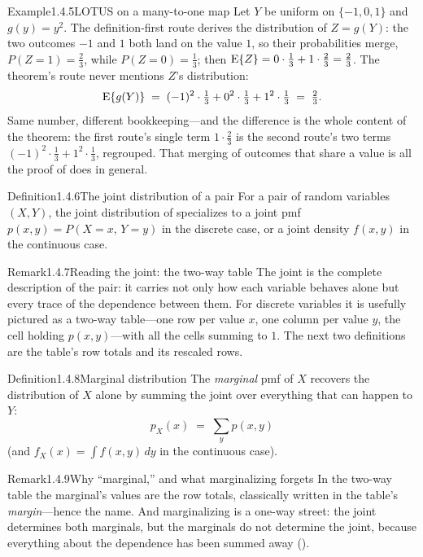 \documentclass[main.tex]{subfiles}
\begin{document}
\begin{ObjL}{Example}{1.4.5}{LOTUS on a many-to-one map}
Let $Y$ be uniform on $\{-1,0,1\}$ and $g(y)=y^2$. The definition-first route derives the
distribution of $Z=g(Y)$: the two outcomes $-1$ and $1$ both land on the value $1$, so their
probabilities merge, $P(Z=1)=\tfrac23$, while $P(Z=0)=\tfrac13$; then
$\mathrm{E}\{Z\}=0\cdot\tfrac13+1\cdot\tfrac23=\tfrac23$. The theorem's route never mentions $Z$'s
distribution:
\[ \mathrm{E}\{g(Y)\} \;=\; (-1)^2\cdot\tfrac13+0^2\cdot\tfrac13+1^2\cdot\tfrac13 \;=\; \tfrac23 . \]
Same number, different bookkeeping---and the difference is the whole content of the theorem:
the first route's single term $1\cdot\tfrac23$ is the second route's two terms
$(-1)^2\cdot\tfrac13+1^2\cdot\tfrac13$, regrouped. That merging of outcomes that share a value
is all the proof of  does in general.
\end{ObjL}

\begin{Obj}{Definition}{1.4.6}{The joint distribution of a pair}
For a pair of random variables $(X,Y)$, the joint distribution of  specializes to
a joint pmf $p(x,y)=P(X=x,\,Y=y)$ in the discrete case, or a joint density $f(x,y)$ in the
continuous case.
\end{Obj}

\begin{ObjL}{Remark}{1.4.7}{Reading the joint: the two-way table}
The joint is the complete description of the pair: it carries not only how each variable
behaves alone but every trace of the dependence between them. For discrete variables it is
usefully pictured as a two-way table---one row per value $x$, one column per value $y$, the
cell holding $p(x,y)$---with all the cells summing to $1$. The next two definitions are the
table's row totals and its rescaled rows.
\end{ObjL}

\begin{Obj}{Definition}{1.4.8}{Marginal distribution}
The \emph{marginal} pmf of $X$ recovers the distribution of $X$ alone by summing the joint
over everything that can happen to $Y$:
\[ p_X(x) \;=\; \sum_y p(x,y) \]
(and $f_X(x)=\int f(x,y)\,dy$ in the continuous case).
\end{Obj}

\begin{ObjL}{Remark}{1.4.9}{Why ``marginal,'' and what marginalizing forgets}
In the two-way table the marginal's values are the row totals, classically written in the
table's \emph{margin}---hence the name. And marginalizing is a one-way street: the joint
determines both marginals, but the marginals do not determine the joint, because everything
about the dependence has been summed away ().
\end{ObjL}
\end{document}

